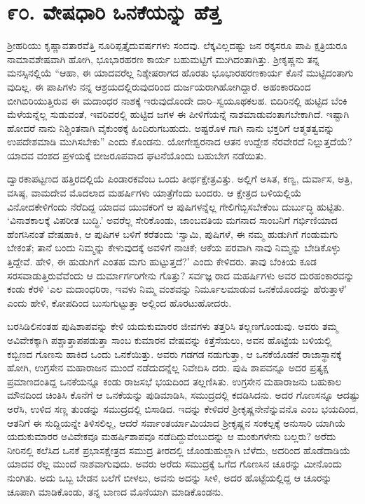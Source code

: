 
\chapter{೯೦. ವೇಷಧಾರಿ ಒನಕೆಯನ್ನು ಹೆತ್ತ}

ಶ್ರೀಹರಿಯು ಕೃಷ್ಣಾವತಾರವೆತ್ತಿ ನೂರಿಪ್ಪತ್ತೈದುವರ್ಷಗಳು ಸಂದವು. ಲೆಕ್ಕವಿಲ್ಲದಷ್ಟು ಜನ ರಕ್ಕಸರೂ ಪಾಪಿ ಕ್ಷತ್ರಿಯರೂ ನಾಮಾವಶೇಷವಾಗಿ ಹೋಗಿ, ಭೂಭಾರಹರಣ ಕಾರ್ಯ ಬಹುಮಟ್ಟಿಗೆ ಮುಗಿದಂತಾಗಿತ್ತು. ಶ್ರೀಕೃಷ್ಣನು ತನ್ನ ಮನಸ್ಸಿನಲ್ಲಿಯೆ “ಆಹಾ, ಈ ಯಾದವರೆಲ್ಲ ನಿಶ್ಶೇಷರಾಗದ ಹೊರತು ಭೂಭಾರಹರಣಕಾರ್ಯ ಕೊನೆ ಮುಟ್ಟಿದಂತಾಗು ವುದಿಲ್ಲ. ಈ ಪಾಪಿಗಳು ನನ್ನ ಆಶ್ರಯದಲ್ಲಿರುವುದರಿಂದ ದುರ್ಜಯರಾಗಿಹೋಗಿದ್ದಾರೆ. ಅಹಂಕಾರದಿಂದ ಬೀಗಿಬಿರಿಯುತ್ತಿರುವ ಈ ಮದಾಂಧರ ನಾಶಕ್ಕೆ ಇರುವುದೊಂದೇ ದಾರಿ–ಸ್ವಯೂಥಕಲಹ. ಬಿದಿರಿನಲ್ಲಿ ಹುಟ್ಟಿದ ಬೆಂಕಿ ಮೆಳೆಯನ್ನೆಲ್ಲ ಸುಡುವಂತೆ, ಇವರಿವರಲ್ಲಿ ಹುಟ್ಟಿದ ಜಗಳ ಈ ಪೀಳಿಗೆಯನ್ನೆ ನಾಶಮಾಡುವಂತಾಗಬೇಕಾಗಿದೆ. ಇಷ್ಟಾಗಿ ಹೋದರೆ ನಾನು ನಿಶ್ಚಿಂತನಾಗಿ ವೈಕುಂಠಕ್ಕೆ ಹಿಂದಿರುಗಬಹುದು. ಅಷ್ಟರೊಳ ಗಾಗಿ ನಾನು ಭಕ್ತರಿಗೆ ಆತ್ಮತತ್ವವನ್ನು ಉಪದೇಶಮಾಡಿ ಮುಗಿಸಬೇಕು” ಎಂದು ಕೊಂಡನು. ಯೋಗೇಶ್ವರನಾದ ಆತನ ಉದ್ದೇಶ ನೆರವೇರದೆ ನಿಲ್ಲುತ್ತದೆಯೆ? ಯಾದವ ವಂಶದ ಪ್ರಳಯಕ್ಕೆ ಬೀಜರೂಪವಾದ ಘಟನೆಯೊಂದು ಬಹುಬೇಗ ನಡೆಯಿತು.

ದ್ವಾರಕಾಪಟ್ಟಣದ ಹತ್ತಿರದಲ್ಲಿಯೆ ಪಿಂಡಾರಕವೆಂಬ ಒಂದು ತೀರ್ಥಕ್ಷೇತ್ರವಿತ್ತು. ಅಲ್ಲಿಗೆ ಅಸಿತ, ಕಣ್ವ, ದುರ್ವಾಸ, ಅತ್ರಿ, ವಸಿಷ್ಠ, ವಾಮದೇವ ಮೊದಲಾದ ಮಹರ್ಷಿಗಳು ಯಾತ್ರೆಗೆಂದು ಬಂದರು. ಆ ಕ್ಷೇತ್ರದ ಬಳಿಯಲ್ಲಿಯೆ ವಿನೋದಕೇಳಿಗೆಂದು ನೆರೆದಿದ್ದ ಯಾದವ ಯುವಕರಿಗೆ ಆ ಪುಷಿಗಳನ್ನೆಲ್ಲ ಗೇಲಿಗೆಬ್ಬಿಸಬೇಕೆಂಬ ದುರ್ಬುದ್ಧಿ ಹುಟ್ಟಿತು. ‘ವಿನಾಶಕಾಲಕ್ಕೆ ವಿಪರೀತ ಬುದ್ಧಿ.’ ಅವರೆಲ್ಲ ಸೇರಿಕೊಂಡು, ಜಾಂಬವತಿಯ ಮಗನಾದ ಸಾಂಬನಿಗೆ ಗರ್ಭಿಣಿಯಾದ ಹೆಂಗಸಿನಂತೆ ವೇಷಹಾಕಿ, ಆ ಪುಷಿಗಳ ಬಳಿಗೆ ಕರೆತಂದು ‘ಸ್ವಾಮಿ, ಪುಷಿಗಳೆ, ಈ ನಮ್ಮ ಹುಡುಗಿಗೆ ಗಂಡುಮಗು ಬೇಕಂತೆ; ತಾನೆ ಬಂದು ನಿಮ್ಮನ್ನು ಕೇಳುವುದಕ್ಕೆ ಅವಳಿಗೆ ನಾಚಿಕೆ; ಆಕೆಯ ಪರವಾಗಿ ನಾವು ನಿಮ್ಮನ್ನು ಬೇಡಿಕೊಳ್ಳು ತ್ತಿದ್ದೇವೆ. ಹೇಳಿ, ಈ ಹುಡುಗಿಗೆ ಎಂತಹ ಮಗು ಹುಟ್ಟುತ್ತದೆ?’ ಎಂದು ಕೇಳಿದರು. ತಾವು ಬೆಂಕಿಯ ಕೂಡ ಸರಸವಾಡುತ್ತಿರುವೆವೆಂದು ಆ ದುರ್ಮಾರ್ಗರಿಗೇನು ಗೊತ್ತು? ಸರ್ವಜ್ಞ ರಾದ ಮಹರ್ಷಿಗಳು ಅವರ ದುರಹಂಕಾರವನ್ನು ಕಂಡು ಕೆರಳಿ ‘ಎಲ ಮದಾಂಧರಿರಾ, ಇವಳು ನಿಮ್ಮ ವಂಶವನ್ನು ನಿರ್ಮೂಲಮಾಡುವ ಒನಕೆಯೊಂದನ್ನು ಹೆರುತ್ತಾಳೆ’ ಎಂದು ಹೇಳಿ, ಕೋಪದಿಂದ ಬುಸುಗುಟ್ಟುತ್ತಾ ಅಲ್ಲಿಂದ ಹೊರಟುಹೋದರು.

ಬರಸಿಡಿಲಿನಂತಹ ಪುಷಿಶಾಪವನ್ನು ಕೇಳಿ ಯದುಕುಮಾರರ ಜೀವಗಳು ತತ್ತರಿಸಿ ತಲ್ಲಣಗೊಂಡುವು. ಅವರು ತಮ್ಮ ಅವಿವೇಕಕ್ಕಾಗಿ ಪಶ್ಚಾತ್ತಾಪಪಡುತ್ತಾ ಸಾಂಬ ಕುಮಾರನ ವೇಷವನ್ನು ಕಿತ್ತೆಸೆಯಲು, ಅವನ ಹೊಟ್ಟೆಯ ಬಳಿಯಲ್ಲಿ ಕಬ್ಬಿಣದ ಗೊಣಸು ಹಾಕಿದ ಒಂದು ಒನಕೆಯಿತ್ತು. ಅವರು ಗಡಗಡ ನಡುಗುತ್ತಾ, ಆ ಒನಕೆಯೊಡನೆ ರಾಜಾಸ್ಥಾನಕ್ಕೆ ಹೋಗಿ, ಉಗ್ರಸೇನ ಮಹಾರಾಜನ ಮುಂದೆ ನಡೆದುದನ್ನೆಲ್ಲ ನಿವೇದಿಸಿ ದರು. ಪುಷಿ ಶಾಪವನ್ನೂ ಅದರ ಪ್ರತ್ಯಕ್ಷ ಪ್ರಮಾಣದಂತಿದ್ದ ಒನಕೆಯನ್ನೂ ಕಂಡು ರಾಜಸಭೆ ಭಯದಿಂದ ತಲ್ಲಣಿಸಿತು. ಉಗ್ರಸೇನ ಮಹಾರಾಜನು ಬಹುಕಾಲ ಮೌನದಿಂದ ಚಿಂತಿಸಿ ಕೊನೆಗೆ ಆ ಒನಕೆಯನ್ನು ಪುಡಿಮಾಡಿಸಿ, ಸಮುದ್ರದಲ್ಲಿ ಕದಡಿಸಿದನು. ಅದರ ಗೊಣಸನ್ನೂ ಆದಷ್ಟು ಅರೆಸಿ, ಉಳಿದ ಸಣ್ಣ ತುಂಡನ್ನು ಸಮುದ್ರದಲ್ಲಿ ಬಿಸಾಡಿದ. ಇದನ್ನು ಕೇಳಿದರೆ ಶ್ರೀಕೃಷ್ಣನೇನೆನ್ನುವನೊ ಎಂಬ ಭಯದಿಂದ, ಆತನಿಗೆ ಈ ಸುದ್ದಿಯನ್ನೇ ತಿಳಿಸಲಿಲ್ಲ, ಆದರೆ ಸರ್ವಾಂತರ್ಯಾಮಿಯಾದ ಶ್ರೀಕೃಷ್ಣನ ಸಂಕಲ್ಪಕ್ಕೆ ಅನುಸಾರಿ ಯಾಗಿಯೆ ಯದುಕುಮಾರರ ಅವಿವೇಕವೂ ಮಹರ್ಷಿಶಾಪವೂ ನಡೆದಿದ್ದುವೆಂಬುದನ್ನು ಆ ಮಂಕುಗಳೇನು ಬಲ್ಲರು? ಅರೆದು ನೀರಿನಲ್ಲಿ ಕಲೆಸಿದ ಒನಕೆ ಪ್ರಭಾಸಕ್ಷೇತ್ರದ ಸಮುದ್ರ ತೀರದಲ್ಲಿ ಜೊಂಡುಹುಲ್ಲಾಗಿ ಬೆಳೆದು, ಅದರಿಂದ ಹೊಡೆದಾಡಿಯೆ ಯಾದವ ರೆಲ್ಲ ಮುಂದೆ ನಾಶವಾಗುವುದು. ಅವರು ಅರೆದು ಸಮುದ್ರಕ್ಕೆ ಒಗೆದ ಗೊಣಸಿನ ಚೂರನ್ನು ಮೀನೊಂದು ನುಂಗಿತು. ಅದು ಒಬ್ಬ ಬೇಡನ ಬಲೆಗೆ ಬೀಳಲು, ಅವನು ಅದನ್ನು ಸೀಳಿ, ಅದರ ಹೊಟ್ಟೆಯಲ್ಲಿದ್ದ ಆ ಚೂರನ್ನು ಚೂಪಾಗಿ ಮಾಡಿಕೊಂಡು, ತನ್ನ ಬಾಣದ ಮೊನೆಯಾಗಿ ಮಾಡಿಕೊಂಡನು.

